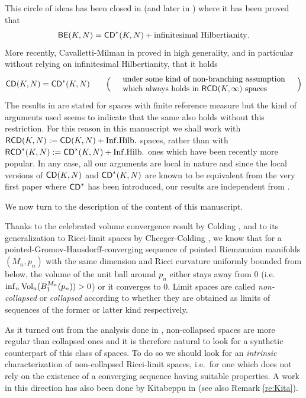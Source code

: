 \documentclass[reqno,11pt]{article}
\numberwithin{equation}{section}
\newcommand{\CD}{{\sf CD}}
\newcommand{\RCD}{{\sf RCD}}
\begin{document}
This circle of ideas has been closed in \cite{Erbar-Kuwada-Sturm13} (and later in \cite{AmbrosioMondinoSavare13}) where it has been proved that 
\[
{\sf BE}(K,N)=\CD^*(K,N)+\text{infinitesimal Hilbertianity}.
\]
More recently, Cavalletti-Milman in \cite{CavMil16} proved in high generality, and in particular without relying on infinitesimal Hilbertianity, that it holds
\begin{equation}
\label{eq:CM}
\CD(K,N)=\CD^*(K,N)\qquad\Big(
\begin{array}{ll}
&\text{under some kind of non-branching assumption}\\
&\text{which always holds in $\RCD(K,\infty)$ spaces}
\end{array}\quad\Big)
\end{equation}
The results in \cite{CavMil16} are stated for  spaces with finite reference measure but the kind of arguments used seems to indicate that the same also holds without this restriction. For  this reason in this manuscript we shall work with $\RCD(K,N):=\CD(K,N)+{\rm Inf.Hilb.}$ spaces, rather than with  $\RCD^*(K,N):=\CD^*(K,N)+{\rm Inf.Hilb.}$ ones which have been recently more popular. In any case, all our arguments are local in nature and since the local versions of $\CD(K,N)$ and $\CD^*(K,N)$ are known to be equivalent from the very first paper \cite{BacherSturm10} where $\CD^*$ has been introduced, our results are independent from \cite{CavMil16}.

\bigskip

We now turn to the description of the content of this manuscript.

Thanks to the celebrated volume convergence result by Colding \cite{Colding97}, and to its generalization to Ricci-limit spaces by Cheeger-Colding \cite{Cheeger-Colding97I}, we know that for a pointed-Gromov-Hausdorff-converging sequence of pointed Riemannian manifolds $(M_n,p_n)$ with the same dimension  and Ricci curvature uniformly bounded from below, the volume of the unit ball around $p_n$ either stays away from 0 (i.e.\ $\inf_n{\rm Vol_n}(B^{M_n}_1(p_n))>0$) or it converges to 0. Limit spaces are called \emph{non-collapsed} or \emph{collapsed} according to whether they are obtained as limits of sequences of the former or latter kind respectively. 

As it turned out from the analysis done in \cite{Cheeger-Colding96,Cheeger-Colding97I,Cheeger-Colding97II,Cheeger-Colding97III}, non-collapsed spaces are more regular than collapsed ones and it is therefore natural to look for a synthetic counterpart of this class of spaces. To do so  we should look for an \emph{intrinsic} characterization of non-collapsed Ricci-limit spaces, i.e.\ for one which does not rely on the existence of a converging sequence having suitable properties. A work in this direction has also been done by Kitabeppu in \cite{Kita17} (see also Remark \ref{re:Kita}).
\end{document}
